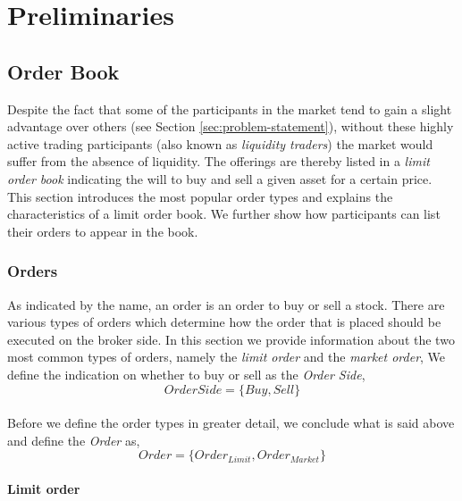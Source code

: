 \chapter{Preliminaries}
\label{chap:preliminaries}

\section{Order Book}

Despite the fact that some of the participants in the market tend to gain a slight advantage over others (see Section \ref{sec:problem-statement}), without these highly active trading participants (also known as \textit{liquidity traders}) the market would suffer from the absence of liquidity.
The offerings are thereby listed in a \textit{limit order book} indicating the will to buy and sell a given asset for a certain price.
This section introduces the most popular order types and explains the characteristics of a limit order book.
We further show how participants can list their orders to appear in the book.

\subsection{Orders}
\label{sec:orders}

As indicated by the name, an order is an order to buy or sell a stock.
There are various types of orders which determine how the order that is placed should be executed on the broker side.
In this section we provide information about the two most common types of orders, namely the \textit{limit order} and the \textit{market order},
We define the indication on whether to buy or sell as the \textit{Order Side},
\begin{equation}\label{eq:order-side}
    OrderSide=\{Buy, Sell\}
\end{equation}
\\
Before we define the order types in greater detail, we conclude what is said above and define the \textit{Order} as,
\begin{equation}\label{eq:order}
Order=\{Order_{Limit}, Order_{Market}\}
\end{equation}

\subsubsection{Limit order}
\label{sec:limit-order}

